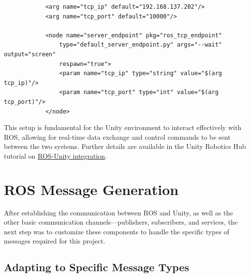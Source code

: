     \begin{verbatim}
            <arg name="tcp_ip" default="192.168.137.202"/>
            <arg name="tcp_port" default="10000"/>
            
            <node name="server_endpoint" pkg="ros_tcp_endpoint" 
                type="default_server_endpoint.py" args="--wait" output="screen" 
                respawn="true">
                <param name="tcp_ip" type="string" value="$(arg tcp_ip)"/>
                <param name="tcp_port" type="int" value="$(arg tcp_port)"/>
            </node>
    \end{verbatim}
    
    
    This setup is fundamental for the Unity environment to interact effectively with ROS, allowing for real-time data exchange and control commands to be sent between the two systems. Further details are available in the Unity Robotics Hub tutorial on \href{https://github.com/Unity-Technologies/Unity-Robotics-Hub/blob/main/tutorials/ros_unity_integration/network.md}{ROS-Unity integration}.


    \section{ROS Message Generation}
    
    After establishing the communication between ROS and Unity, as well as the other basic communication channels—publishers, subscribers, and services, the next step was to customize these components to handle the specific types of messages required for this project.
    
    \subsection{Adapting to Specific Message Types}
    
